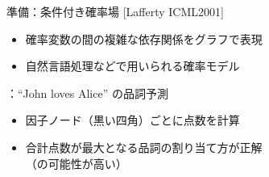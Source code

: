\begin{block}{準備：条件付き確率場 {\small{}[Lafferty ICML2001]}}
  \begin{itemize}
  \item 確率変数の間の複雑な依存関係をグラフで表現
  \item 自然言語処理などで用いられる確率モデル
  \end{itemize}
  ：``John loves Alice'' の品詞予測
  \begin{itemize}
  \item 因子ノード（黒い四角）ごとに点数を計算
  \item \alert{合計点数が最大}となる品詞の割り当て方が正解\\（の可能性が高い）
  \end{itemize}
  \baselineskip
  \begin{columns}[onlytextwidth]
\end{columns}
\end{block}
